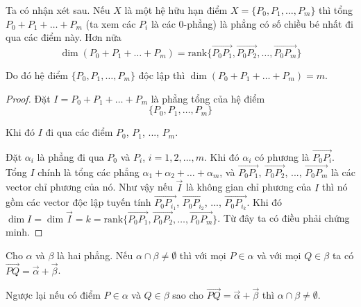 Ta có nhận xét sau. Nếu $X$ là một hệ hữu hạn điểm $X = \{P_0, P_1, \ldots, P_m \}$ thì tổng $P_0 + P_1 + \ldots + P_m$ (ta xem các $P_i$ là các 0-phẳng) là phẳng có số chiều bé nhất đi qua các điểm này. Hơn nữa \[\dim (P_0 + P_1 + \ldots + P_m) = \text{rank} \{ \overrightarrow{P_0 P_1}, \overrightarrow{P_0 P_2}, \ldots, \overrightarrow{P_0 P_m} \}\]

Do đó hệ điểm $\{ P_0, P_1, \ldots, P_m \}$ độc lập thì $\dim (P_0 + P_1 + \ldots + P_m) = m$.

\begin{proof}
	Đặt $I = P_0 + P_1 + \ldots + P_m$ là phẳng tổng của hệ điểm \[ \{P_0, P_1, \ldots, P_m\} \]
    
    Khi đó $I$ đi qua các điểm $P_0$, $P_1$, ..., $P_m$.
	
	Đặt $\alpha_i$ là phẳng đi qua $P_0$ và $P_i$, $i = 1, 2, \ldots, m$. Khi đó $\alpha_i$ có phương là $\overrightarrow{P_0 P_i}$. Tổng $I$ chính là tổng các phẳng $\alpha_1 + \alpha_2 + \ldots + \alpha_m$, và $\overrightarrow{P_0 P_1}$, $\overrightarrow{P_0 P_2}$, ..., $\overrightarrow{P_0 P_m}$ là các vector chỉ phương của nó. Như vậy nếu $\overrightarrow{I}$ là không gian chỉ phương của $I$ thì nó gồm các vector độc lập tuyến tính $\overrightarrow{P_0 P_{i_1}}$, $\overrightarrow{P_0 P_{i_2}}$, ..., $\overrightarrow{P_0 P_{i_k}}$. Khi đó $\dim I = \dim \overrightarrow{I} = k = \text{rank} \{ \overrightarrow{P_0 P_1}, \overrightarrow{P_0 P_2}, \ldots, \overrightarrow{P_0 P_m}\}$. Từ đây ta có điều phải chứng minh.
\end{proof}

\begin{theorem}
	Cho $\alpha$ và $\beta$ là hai phẳng. Nếu $\alpha \cap \beta \neq \emptyset$ thì với mọi $P \in \alpha$ và với mọi $Q \in \beta$ ta có $\overrightarrow{PQ} = \overrightarrow{\alpha} + \overrightarrow{\beta}$.
    
    Ngược lại nếu có điểm $P \in \alpha$ và $Q \in \beta$ sao cho $\overrightarrow{PQ} = \overrightarrow{\alpha} + \overrightarrow{\beta}$ thì $\alpha \cap \beta \neq \emptyset$.
	\label{theorem3}
\end{theorem}

